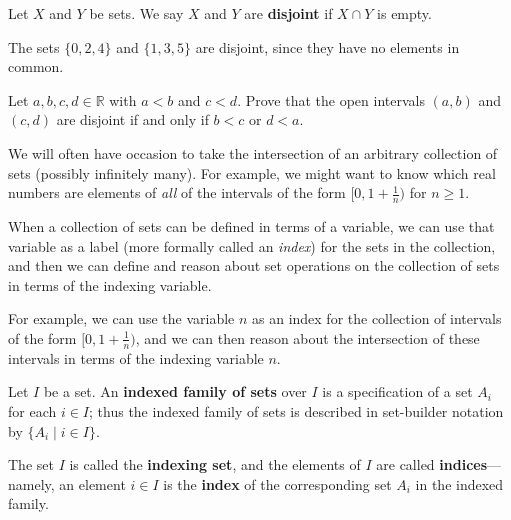 
\begin{definition}
\label{defDisjoint}
Let $X$ and $Y$ be sets. We say $X$ and $Y$ are \textbf{disjoint} if $X \cap Y$ is empty.
\end{definition}

\begin{example}
The sets $\{ 0,2,4 \}$ and $\{ 1,3,5 \}$ are disjoint, since they have no elements in common.
\end{example}

\begin{exercise}
Let $a,b,c,d \in \mathbb{R}$ with $a<b$ and $c<d$. Prove that the open intervals $(a,b)$ and $(c,d)$ are disjoint if and only if $b<c$ or $d<a$.
\end{exercise}


We will often have occasion to take the intersection of an arbitrary collection of sets (possibly infinitely many). For example, we might want to know which real numbers are elements of \textit{all} of the intervals of the form $[0, 1+\frac{1}{n})$ for $n \ge 1$.

When a collection of sets can be defined in terms of a variable, we can use that variable as a label (more formally called an \textit{index}) for the sets in the collection, and then we can define and reason about set operations on the collection of sets in terms of the indexing variable.

For example, we can use the variable $n$ as an index for the collection of intervals of the form $[0,1+\frac{1}{n})$, and we can then reason about the intersection of these intervals in terms of the indexing variable $n$.

\begin{definition}
\label{defIndexedFamily}
Let $I$ be a set. An \textbf{indexed family of sets} over $I$ is a specification of a set $A_i$ for each $i \in I$; thus the indexed family of sets is described in set-builder notation by $\{ A_i \mid i \in I \}$.

The set $I$ is called the \textbf{indexing set}, and the elements of $I$ are called \textbf{indices}---namely, an element $i \in I$ is the \textbf{index} of the corresponding set $A_i$ in the indexed family.
\end{definition}

